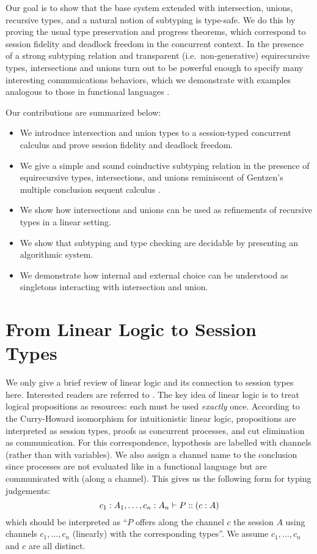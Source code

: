 \documentclass[a4paper,USenglish]{lipics-v2016}
\begin{document}
Our goal is to show that the base system extended with intersection, unions, recursive types, and a natural notion of subtyping is type-safe. We do this by proving the usual type preservation and progress theorems, which correspond to session fidelity and deadlock freedom in the concurrent context. In the presence of a strong subtyping relation and transparent (i.e.\ non-generative)  equirecursive types, intersections and unions turn out to be powerful enough to specify many interesting communications behaviors, which we demonstrate with examples analogous to those in functional languages \cite{FreemanP91,Dunfield03}.

Our contributions are summarized below:
\begin{itemize}
  \item We introduce intersection and union types to a session-typed concurrent calculus and prove session fidelity and deadlock freedom.
  \item We give a simple and sound coinductive subtyping relation in the presence of equirecursive types, intersections, and unions reminiscent of Gentzen's multiple conclusion sequent calculus \cite{Gentzen35, Girard87}.
  \item We show how intersections and unions can be used as refinements of recursive types in a linear setting.
  \item We show that subtyping and type checking are decidable by presenting an algorithmic system.
  \item We demonstrate how internal and external choice can be understood as singletons interacting with intersection and union.
\end{itemize}


\section{From Linear Logic to Session Types}
\label{base}
We only give a brief review of linear logic and its connection to session types here. Interested readers are referred to \cite{CairesP10, PfenningG15, Honda93}. The key idea of linear logic is to treat logical propositions as resources: each must be used \emph{exactly} once. According to the Curry-Howard isomorphism for intuitionistic linear logic, propositions are interpreted as session types, proofs as concurrent processes, and cut elimination as communication. For this correspondence, hypothesis are labelled with channels (rather than with variables). We also assign a channel name to the conclusion since processes are not evaluated like in a functional language but are communicated with (along a channel). This gives us the following form for typing judgements:
$$ c_1 : A_1, \ldots, c_n : A_n \vdash P :: (c : A)$$
which should be interpreted as ``$P$ offers along the channel $c$ the session $A$ using channels $c_1, \ldots, c_n$ (linearly) with the corresponding types''. We assume $c_1, \ldots, c_n$ and $c$ are all distinct.
\end{document}
